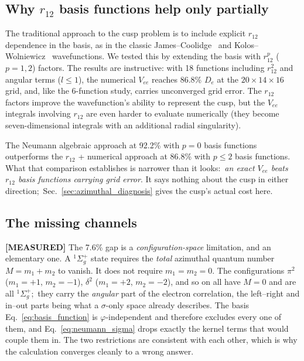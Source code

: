 \documentclass[aps,pra,twocolumn,superscriptaddress,longbibliography]{revtex4-2}
\begin{document}
\subsection{Why \texorpdfstring{$r_{12}$}{r12} basis functions
help only partially}

The traditional approach to the cusp problem is to include
explicit $r_{12}$ dependence in the basis, as in the classic
James--Coolidge~\cite{James1933} and Kolos--Wolniewicz~\cite{Kolos1968}
wavefunctions.  We tested this by extending the basis with
$r_{12}^p$ ($p = 1, 2$) factors.  The results are instructive:
with 18 functions including $r_{12}^2$ and angular terms
($l \leq 1$), the numerical $V_{ee}$ reaches 86.8\% $D_e$
at the $20\times 14\times 16$ grid, and, like the 6-function study,
carries unconverged grid error.  The $r_{12}$ factors improve
the wavefunction's ability to represent the cusp, but the
$V_{ee}$ integrals involving $r_{12}$ are even harder to
evaluate numerically (they become seven-dimensional integrals
with an additional radial singularity).

The Neumann algebraic approach at 92.2\% with $p = 0$ basis
functions outperforms the $r_{12}$ + numerical approach at
86.8\% with $p \leq 2$ basis functions.  What that comparison
establishes is narrower than it looks:\ \emph{an exact $V_{ee}$ beats
$r_{12}$ basis functions carrying grid error}.  It says nothing about
the cusp in either direction;\
Sec.~\ref{sec:azimuthal_diagnosis} gives the cusp's actual cost here.

\subsection{The missing channels}

\textbf{[MEASURED]} The 7.6\% gap is a \emph{configuration-space}
limitation, and an elementary one.  A $^1\Sigma_g^+$ state requires
the \emph{total} azimuthal quantum number $M = m_1 + m_2$ to vanish.
It does not require $m_1 = m_2 = 0$.  The configurations
$\pi^2$ ($m_1 = +1$, $m_2 = -1$), $\delta^2$ ($m_1 = +2$,
$m_2 = -2$), and so on all have $M = 0$ and are all
$^1\Sigma_g^+$;\ they carry the \emph{angular} part of the electron
correlation, the left--right and in--out parts being what a
$\sigma$-only space already describes.  The basis
Eq.~\eqref{eq:basis_function} is $\varphi$-independent and therefore
excludes every one of them, and Eq.~\eqref{eq:neumann_sigma} drops
exactly the kernel terms that would couple them in.  The two
restrictions are consistent with each other, which is why the
calculation converges cleanly to a wrong answer.
\end{document}
